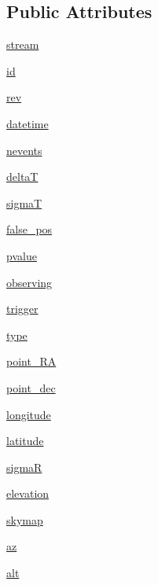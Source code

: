 \subsection*{Public Attributes}
\begin{DoxyCompactItemize}
\item 
\hyperlink{classbasic__sim__old_1_1_sim_event_ac75852235bc1c9636274dbfb52d22394}{stream}
\item 
\hyperlink{classbasic__sim__old_1_1_sim_event_a5c0d91c14f018c2ddd192e6a26767d79}{id}
\item 
\hyperlink{classbasic__sim__old_1_1_sim_event_a6b48b8974f4ef4541bf9c09b7dd7a054}{rev}
\item 
\hyperlink{classbasic__sim__old_1_1_sim_event_adbe3757a4fee40731f878bd411c9a763}{datetime}
\item 
\hyperlink{classbasic__sim__old_1_1_sim_event_a34b942af37c343a76ffb11ec96507ee4}{nevents}
\item 
\hyperlink{classbasic__sim__old_1_1_sim_event_af92dc762c35bd75c05bb8bf6c9616b00}{delta\-T}
\item 
\hyperlink{classbasic__sim__old_1_1_sim_event_afd43199470abde63072e5e91d8217cf7}{sigma\-T}
\item 
\hyperlink{classbasic__sim__old_1_1_sim_event_adabdf127ae2580a06fbc05cf768cf8a6}{false\-\_\-pos}
\item 
\hyperlink{classbasic__sim__old_1_1_sim_event_a3028fb127e8ce49c2275bcf26a7758f0}{pvalue}
\item 
\hyperlink{classbasic__sim__old_1_1_sim_event_a6884bb4ef3a110c576b844ba4c55a2de}{observing}
\item 
\hyperlink{classbasic__sim__old_1_1_sim_event_ad97bf46d023e5e0b3e31471c33476b3a}{trigger}
\item 
\hyperlink{classbasic__sim__old_1_1_sim_event_aa62ee00b9bd61aec1cf8d675e10bcdb1}{type}
\item 
\hyperlink{classbasic__sim__old_1_1_sim_event_a472fbb98ba6f3a6bb174896f23866225}{point\-\_\-\-R\-A}
\item 
\hyperlink{classbasic__sim__old_1_1_sim_event_a208e8a3ab9415076107943511f7540d5}{point\-\_\-dec}
\item 
\hyperlink{classbasic__sim__old_1_1_sim_event_a1c0402df96ecafb9ba8ecb7d6e59f329}{longitude}
\item 
\hyperlink{classbasic__sim__old_1_1_sim_event_a4d9d58c5b1062e326ed76c1fb29f51f7}{latitude}
\item 
\hyperlink{classbasic__sim__old_1_1_sim_event_aa41d3a01bb3d4d36266c8aea073d2940}{sigma\-R}
\item 
\hyperlink{classbasic__sim__old_1_1_sim_event_a6711689c3329b821bd9f55692bd37c3c}{elevation}
\item 
\hyperlink{classbasic__sim__old_1_1_sim_event_a3963adc4a383e33d00e1be986fa37371}{skymap}
\item 
\hyperlink{classbasic__sim__old_1_1_sim_event_abd2b40dbe9eb82436ce686a4e921a262}{az}
\item 
\hyperlink{classbasic__sim__old_1_1_sim_event_a2e0e4bd4058be8f6818604cf8b125bf0}{alt}
\end{DoxyCompactItemize}
